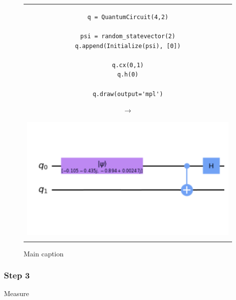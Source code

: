 \begin{figure}[h]
\centering
\begin{tabular}{c}
\begin{minipage}[c]{.45\linewidth}
\begin{verbatim}
q = QuantumCircuit(4,2)

psi = random_statevector(2)
q.append(Initialize(psi), [0])

q.cx(0,1)
q.h(0)

q.draw(output='mpl')
\end{verbatim}
\end{minipage}
\begin{minipage}[c]{.1\linewidth}
\centering
$\rightarrow$
\end{minipage}
\begin{minipage}[c]{.4\linewidth}
\centering
\includegraphics[width=\textwidth]{lab3/images/Step2.png}
\end{minipage}\\
\\ %
\end{tabular}
\caption{Main caption}
\label{step2}
\end{figure}


\subsubsection{Step 3}
Measure

